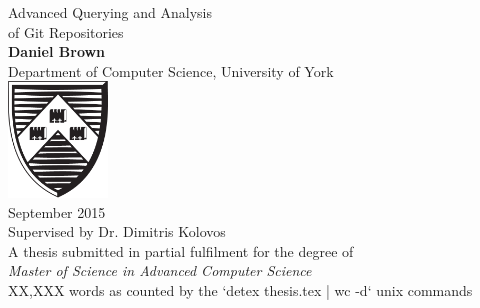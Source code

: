 \documentclass[11pt]{book}
\begin{document}
\begin{titlepage}
	\begin{center}
		{\huge Advanced Querying and Analysis\\ of Git Repositories\\}
		\vspace{1.5cm}
		{\Large \textbf{Daniel Brown} \\}
		{\Large Department of Computer Science, University of York \\}
		\vspace{1.5cm}
		\includegraphics[width=100px]{images/university-of-york-shield} \\
		\vspace{1.5cm}
		{\Large September 2015 \\}
		\vspace{1.5cm}
		\Large Supervised by Dr. Dimitris Kolovos \\
		\vspace{1.5cm}
		\Large A thesis submitted in partial fulfilment for the degree of \\ \textit{Master of Science in Advanced Computer Science}\\
		\vspace{5cm}
		\small XX,XXX words as counted by the `detex thesis.tex | wc -d` unix commands
	\end{center}
	\restoregeometry
\end{titlepage}
\end{document}
